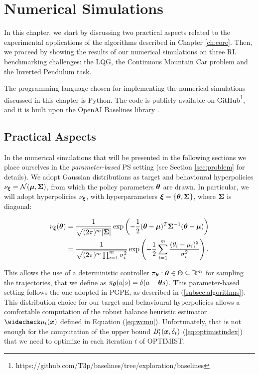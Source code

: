 
\chapter{Numerical Simulations} \label{ch:experiments}
In this chapter, we start by discussing two practical aspects related to the experimental applications of the algorithms described in Chapter \ref{ch:core}. Then, we proceed by showing the results of our numerical simulations on three \gls{RL} benchmarking challenges: the \gls{LQG}, the Continuous Mountain Car problem and the Inverted Pendulum task.

The programming language chosen for implementing the numerical simulations discussed in this chapter is Python. The code is publicly available on GitHub\footnote{https://github.com/T3p/baselines/tree/exploration/baselines}, and it is built upon the OpenAI Baselines library \cite{baselines}.

\section{Practical Aspects} \label{sec:practical}
In the numerical simulations that will be presented in the following sections we place ourselves in the \emph{parameter-based} \gls{PS} setting (see Section \ref{sec:problem} for details). We adopt Gaussian distributions as target and behavioural hyperpolicies $\nu_{\boldsymbol{\xi}}= \mathcal{N}(\boldsymbol{\mu},\boldsymbol{\Sigma})$, from which the policy parameters $\boldsymbol{\theta}$ are drawn. In particular, we will adopt hyperpolicies $\nu_{\boldsymbol{\xi}}$, with hyperparameters $\boldsymbol{\xi}=\{\boldsymbol{\theta},\boldsymbol{\Sigma}\}$, where $\boldsymbol{\Sigma}$ is diagonal: 

\begin{align}
\nu_{\boldsymbol{\xi}}(\boldsymbol{\theta}) & = \frac{1}{\sqrt{(2\pi)^m |\boldsymbol{\Sigma} |}}\exp\left(
	-\frac{1}{2} (\boldsymbol{\theta} - \boldsymbol{\mu} )^T\boldsymbol{\Sigma}^{-1}(\boldsymbol{\theta} - \boldsymbol{\mu} )\right)\\
	& = \frac{1}{\sqrt{(2\pi)^m \prod_{i=1}^{m} \sigma_{i}^2}}\exp\left(
	-\frac{1}{2} \sum\limits_{i=1}^m\frac{(\theta_{i}-\mu_{i})^2}{\sigma_{i}^2}\right).
\end{align}

This allows the use of a deterministic controller $\pi_{\boldsymbol{\theta}}: \boldsymbol{\theta}\in\Theta\subseteq\mathbb{R}^m$ for sampling the trajectories, that we define as $\pi_{\boldsymbol{\theta}}(a|s)=\delta(a-\boldsymbol{\theta} s)$. This parameter-based setting follows the one adopted in \gls{PGPE}, as described in (\ref{subsec:algorithms}). \\
This distribution choice for our target and behavioural hyperpolicies allows a comfortable computation of the robust balance heuristic estimator $\wc{\mu}_t(\vx)$ defined in Equation (\ref{eq:wcmu}). Unfortunately, that is not enough for the computation of the upper bound $B_t^{\epsilon}(\boldsymbol{x},\delta_t)$ (\ref{eq:optimistindex}) that we need to optimize in each iteration $t$ of \gls{OPTIMIST}.

